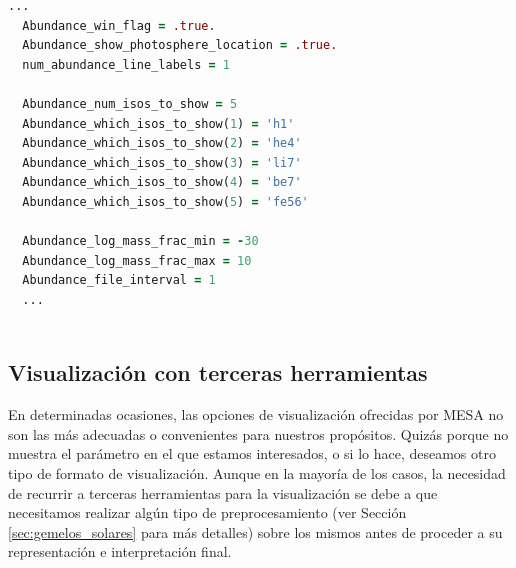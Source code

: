 \begin{lstlisting}[language=Fortran, float, caption={Ejemplo de configuración de la herramienta pgstart para la generación de una gráfica de abundacias de elementos químicos.}, label={lst:pg_star_config}]
  ...	
  Abundance_win_flag = .true.
  Abundance_show_photosphere_location = .true.
  num_abundance_line_labels = 1

  Abundance_num_isos_to_show = 5
  Abundance_which_isos_to_show(1) = 'h1'
  Abundance_which_isos_to_show(2) = 'he4'
  Abundance_which_isos_to_show(3) = 'li7'
  Abundance_which_isos_to_show(4) = 'be7'
  Abundance_which_isos_to_show(5) = 'fe56'
  
  Abundance_log_mass_frac_min = -30
  Abundance_log_mass_frac_max = 10
  Abundance_file_interval = 1
  ...
  
\end{lstlisting}


\subsection{Visualización con terceras herramientas}
En determinadas ocasiones, las opciones de visualización ofrecidas por MESA no son las más adecuadas o convenientes para nuestros propósitos. Quizás porque no muestra el parámetro en el que estamos interesados, o si lo hace, deseamos otro tipo de formato de visualización. Aunque en la mayoría de los casos, la necesidad de recurrir a terceras herramientas para la visualización se debe a que necesitamos realizar algún tipo de preprocesamiento (ver Sección \ref{sec:gemelos_solares} para más detalles) sobre los mismos antes de proceder a su representación e interpretación final.\par

